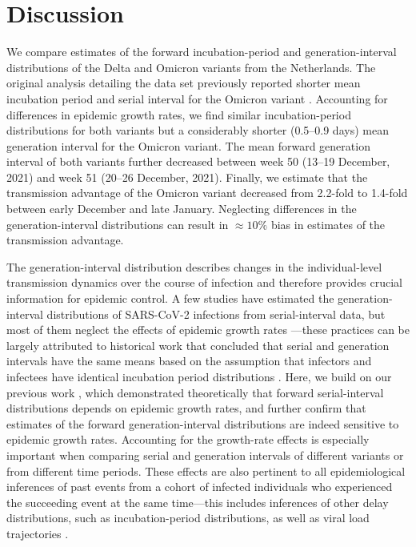 \documentclass[12pt]{article}
\begin{document}
\section{Discussion}

We compare estimates of the forward incubation-period and generation-interval distributions of the Delta and Omicron variants from the Netherlands.
The original analysis detailing the data set previously reported shorter mean incubation period and serial interval for the Omicron variant \citep{backer2021omicron}.
Accounting for differences in epidemic growth rates, we find similar incubation-period distributions for both variants but a considerably shorter (0.5--0.9 days) mean generation interval for the Omicron variant.
The mean forward generation interval of both variants further decreased between week 50 (13--19 December, 2021) and week 51 (20--26 December, 2021).
Finally, we estimate that the transmission advantage of the Omicron variant decreased from 2.2-fold to 1.4-fold between early December and late January. 
Neglecting differences in the generation-interval distributions can result in $\approx 10\%$ bias in estimates of the transmission advantage.

The generation-interval distribution describes changes in the individual-level transmission dynamics over the course of infection and therefore provides crucial information for epidemic control.
A few studies have estimated the generation-interval distributions of SARS-CoV-2 infections from serial-interval data, but most of them neglect the effects of epidemic growth rates \citep{ganyani2020estimating,he2020temporal,zhao2021estimating,hart2022generation}---these practices can be largely attributed to historical work that concluded that serial and generation intervals have the same means based on the assumption that infectors and infectees have identical incubation period distributions \citep{svensson2007note,britton2019estimation,lehtinen2021relationship}.
Here, we build on our previous work \citep{park2021forward}, which demonstrated theoretically that forward serial-interval distributions depends on epidemic growth rates, and further confirm that estimates of the forward generation-interval distributions are indeed sensitive to epidemic growth rates.
Accounting for the growth-rate effects is especially important when comparing serial and generation intervals of different variants or from different time periods.
These effects are also pertinent to all epidemiological inferences of past events from a cohort of infected individuals who experienced the succeeding event at the same time---this includes inferences of other delay distributions, such as incubation-period distributions, as well as viral load trajectories \citep{hay2021estimating}.
\end{document}
